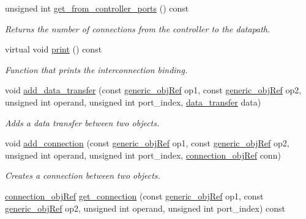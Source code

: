 \begin{DoxyCompactItemize}
unsigned int \hyperlink{classconn__binding_a1e5c6ff971f65ab857d0c599b97e9e88}{get\+\_\+from\+\_\+controller\+\_\+ports} () const
\begin{DoxyCompactList}\small\item\em Returns the number of connections from the controller to the datapath. \end{DoxyCompactList}\item 
virtual void \hyperlink{classconn__binding_afa60c298700898adbe9f7c03a4b5cd48}{print} () const
\begin{DoxyCompactList}\small\item\em Function that prints the interconnection binding. \end{DoxyCompactList}\item 
void \hyperlink{classconn__binding_a43c6611fbbb3ee279fb4a87c1940a0a1}{add\+\_\+data\+\_\+transfer} (const \hyperlink{generic__obj_8hpp_acb533b2ef8e0fe72e09a04d20904ca81}{generic\+\_\+obj\+Ref} op1, const \hyperlink{generic__obj_8hpp_acb533b2ef8e0fe72e09a04d20904ca81}{generic\+\_\+obj\+Ref} op2, unsigned int operand, unsigned int port\+\_\+index, \hyperlink{conn__binding_8hpp_ae44ffa64566f2bb3ce6941833ac940fb}{data\+\_\+transfer} data)
\begin{DoxyCompactList}\small\item\em Adds a data transfer between two objects. \end{DoxyCompactList}\item 
void \hyperlink{classconn__binding_a2ca6e2f49d291760b4455cea98baebea}{add\+\_\+connection} (const \hyperlink{generic__obj_8hpp_acb533b2ef8e0fe72e09a04d20904ca81}{generic\+\_\+obj\+Ref} op1, const \hyperlink{generic__obj_8hpp_acb533b2ef8e0fe72e09a04d20904ca81}{generic\+\_\+obj\+Ref} op2, unsigned int operand, unsigned int port\+\_\+index, \hyperlink{connection__obj_8hpp_af3c6e389c8543ed97dd9ba412f2c141b}{connection\+\_\+obj\+Ref} conn)
\begin{DoxyCompactList}\small\item\em Creates a connection between two objects. \end{DoxyCompactList}\item 
\hyperlink{connection__obj_8hpp_af3c6e389c8543ed97dd9ba412f2c141b}{connection\+\_\+obj\+Ref} \hyperlink{classconn__binding_a39a42582d79c8e8cb85017f32ec7c56c}{get\+\_\+connection} (const \hyperlink{generic__obj_8hpp_acb533b2ef8e0fe72e09a04d20904ca81}{generic\+\_\+obj\+Ref} op1, const \hyperlink{generic__obj_8hpp_acb533b2ef8e0fe72e09a04d20904ca81}{generic\+\_\+obj\+Ref} op2, unsigned int operand, unsigned int port\+\_\+index) const

\end{DoxyCompactItemize}
